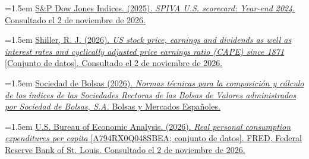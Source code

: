\documentclass[10pt,a4paper]{article}
\begin{document}
\noindent\hangindent=1.5em \href{https://www.spglobal.com/spdji/en/spiva/article/spiva-us-year-end-2024}{S\&P Dow Jones Indices. (2025). \textit{SPIVA U.S. scorecard: Year-end 2024}. Consultado el 2 de noviembre de 2026.}

\noindent\hangindent=1.5em \href{https://shillerdata.com/}{Shiller, R. J. (2026). \textit{US stock price, earnings and dividends as well as interest rates and cyclically adjusted price earnings ratio (CAPE) since 1871} [Conjunto de datos]. Consultado el 2 de noviembre de 2026.}

\noindent\hangindent=1.5em \href{https://www.bolsasymercados.es/dam/descargas/indices/regulacion/normas-tecnicas-calculo-indices-bolsas-es.pdf}{Sociedad de Bolsas (2026). \textit{Normas técnicas para la composición y cálculo de los índices de las Sociedades Rectoras de las Bolsas de Valores administrados por Sociedad de Bolsas, S.A.} Bolsas y Mercados Españoles.}

\noindent\hangindent=1.5em \href{https://fred.stlouisfed.org/series/A794RX0Q048SBEA}{U.S. Bureau of Economic Analysis. (2026). \textit{Real personal consumption expenditures per capita} [A794RX0Q048SBEA; conjunto de datos]. FRED, Federal Reserve Bank of St. Louis. Consultado el 2 de noviembre de 2026.}
\end{document}
